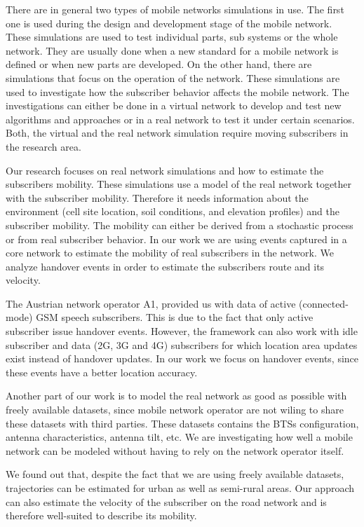\documentclass[twocolumn]{bmcart}%
\begin{document}
There are in general two types of mobile networks simulations in use. The first one is used during the design and development stage of the mobile network. These simulations are used to test individual parts, sub systems or the whole network. They are usually done when a new standard for a mobile network is defined or when new parts are developed. On the other hand, there are simulations that focus on the operation of the network. These simulations are used to investigate how the subscriber behavior affects the mobile network. The investigations can either be done in a virtual network to develop and test new algorithms and approaches or in a real network to test it under certain scenarios. Both, the virtual and the real network simulation require moving subscribers in the research area.

Our research focuses on real network simulations and how to estimate the subscribers mobility. These simulations use a model of the real network together with the subscriber mobility. Therefore it needs information about the environment (cell site location, soil conditions, and elevation profiles) and the subscriber mobility. The mobility can either be derived from a stochastic process or from real subscriber behavior. In our work we are using events captured in a core network to estimate the mobility of real subscribers in the network. We analyze handover events in order to estimate the subscribers route and its velocity.

The Austrian network operator A1, provided us with data of active (connected-mode) GSM speech subscribers. This is due to the fact that only active subscriber issue handover events. However, the framework can also work with idle subscriber and data (2G, 3G and 4G) subscribers for which location area updates exist instead of handover updates. In our work we focus on handover events, since these events have a better location accuracy.

Another part of our work is to model the real network as good as possible with freely available datasets, since mobile network operator are not wiling to share these datasets with third parties. These datasets contains the BTSs configuration, antenna characteristics, antenna tilt, etc. We are investigating how well a mobile network can be modeled without having to rely on the network operator itself.

We found out that, despite the fact that we are using freely available datasets, trajectories can be estimated for urban as well as semi-rural areas. Our approach can also estimate the velocity of the subscriber on the road network and is therefore well-suited to describe its mobility.
\end{document}
